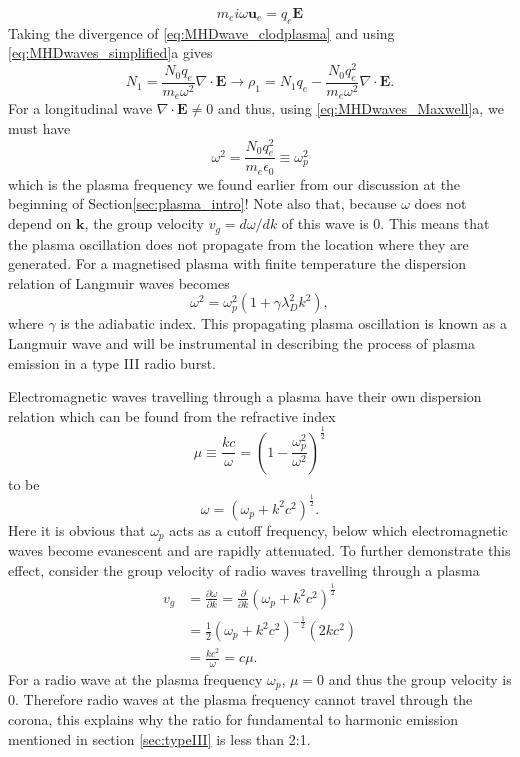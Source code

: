 \begin{equation}
\label{eq:MHDwave_clodplasma}
m_e i \omega \mathbf{u}_e = q_e \mathbf{E}
\end{equation}
Taking the divergence of \ref{eq:MHDwave_clodplasma} and using \ref{eq:MHDwaves_simplified}a gives
\begin{equation}
N_1 = \frac{N_0 q_e}{m_e \omega^2} \nabla \cdot \mathbf{E} \rightarrow \rho_1 = N_1 q_e - \frac{N_0 q_e^2}{m_e \omega^2} \nabla \cdot \mathbf{E}.
\end{equation}
For a longitudinal wave $\nabla \cdot \mathbf{E} \neq 0$ and thus, using \ref{eq:MHDwaves_Maxwell}a, we must have
\begin{equation}
\label{eq:MHDwave_plasmafreq}
\omega^2 = \frac{N_0 q_e^2}{m_e \epsilon_0} \equiv \omega^2_{p}
\end{equation}
which is the plasma frequency we found earlier from our discussion at the beginning of Section\ref{sec:plasma_intro}! Note also that, because $\omega$ does not depend on $\mathbf{k}$, the group velocity $v_g = d\omega / d k$ of this wave is 0. This means that the plasma oscillation does not propagate from the location where they are generated. For a magnetised plasma with finite temperature the dispersion relation of Langmuir waves becomes 
\begin{equation}
\label{eq:MHDwave_langmuir}
\omega^2 = \omega_p^2(1 + \gamma \lambda_D^2k^2),
\end{equation}
where $\gamma$ is the adiabatic index.
This propagating plasma oscillation is known as a Langmuir wave and will be instrumental in describing the process of plasma emission in a type III radio burst.

Electromagnetic waves travelling through a plasma have their own dispersion relation which can be found from the refractive index
\begin{equation}
\mu \equiv \frac{kc}{\omega} = \left(1 - \frac{\omega_p^2}{\omega^2}\right)^{\frac{1}{2}}
\end{equation}
to be
\begin{equation}
\label{eq:MHDwave_emdispersion}
\omega = (\omega_p +k^2 c^2)^\frac{1}{2}.
\end{equation}
Here it is obvious that $\omega_p$ acts as a cutoff frequency, below which electromagnetic waves become evanescent and are rapidly attenuated. To further demonstrate this effect, consider the group velocity of radio waves travelling through a plasma
\begin{align}
v_g & = \frac{\partial \omega}{\partial k} = \frac{\partial}{\partial k} (\omega_p +k^2 c^2)^\frac{1}{2} \\ \nonumber
& = \frac{1}{2}(\omega_p +k^2 c^2)^{-\frac{1}{2}} (2kc^2)\\ \nonumber
& = \frac{kc^2}{\omega} = c\mu.
\end{align}
For a radio wave at the plasma frequency $\omega_p$, $\mu = 0$ and thus the group velocity is 0. Therefore radio waves at the plasma frequency cannot travel through the corona, this explains why the ratio for fundamental to harmonic emission mentioned in section \ref{sec:typeIII} is less than 2:1. 


